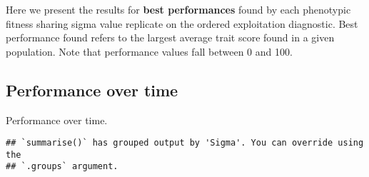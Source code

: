 \documentclass[]{book}
\newenvironment{Shaded}{\begin{snugshade}}{\end{snugshade}}
\newcommand{\DataTypeTok}[1]{\textcolor[rgb]{0.13,0.29,0.53}{#1}}
\newcommand{\KeywordTok}[1]{\textcolor[rgb]{0.13,0.29,0.53}{\textbf{#1}}}
\newcommand{\NormalTok}[1]{#1}
\newcommand{\OperatorTok}[1]{\textcolor[rgb]{0.81,0.36,0.00}{\textbf{#1}}}
\newcommand{\StringTok}[1]{\textcolor[rgb]{0.31,0.60,0.02}{#1}}
\begin{document}
Here we present the results for \textbf{best performances} found by each phenotypic fitness sharing sigma value replicate on the ordered exploitation diagnostic.
Best performance found refers to the largest average trait score found in a given population.
Note that performance values fall between 0 and 100.

\hypertarget{performance-over-time-12}{%
\subsection{Performance over time}\label{performance-over-time-12}}

Performance over time.

\begin{Shaded}
\end{Shaded}

\begin{verbatim}
## `summarise()` has grouped output by 'Sigma'. You can override using the
## `.groups` argument.
\end{verbatim}
\end{document}
